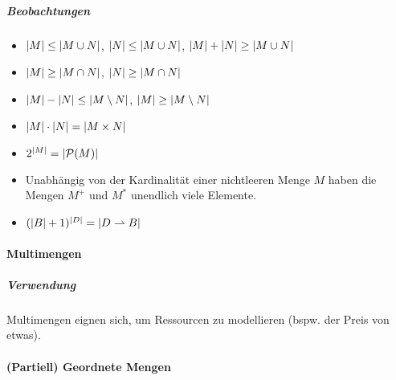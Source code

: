 	\subparagraph{Beobachtungen}
		\begin{itemize}
			\item $ \abs{M} \leq \abs{M \cup N} $, $ \abs{N} \leq \abs{M \cup N} $, $ \abs{M} + \abs{N} \geq \abs{M \cup N} $
			\item $ \abs{M} \geq \abs{M \cap N} $, $ \abs{N} \geq \abs{M \cap N} $
			\item $ \abs{M} - \abs{N} \leq \abs{M \setminus N} $, $ \abs{M} \geq \abs{M \setminus N} $
			\item $ \abs{M} \cdot \abs{N} = \abs{M \times N} $
			\item $ 2 ^ { \abs{M} } = \abs{\mathcal{P}(M)} $
			\item Unabhängig von der Kardinalität einer nichtleeren Menge $ M $ haben die Mengen $ M ^ + $ und $ M ^ * $ unendlich viele Elemente.
			\item $ (\abs{B} + 1) ^ \abs{D} = \abs{D \rightharpoonup B} $
		\end{itemize}

	\paragraph{Multimengen}

		\subparagraph{Verwendung}
			Multimengen eignen sich, um Ressourcen zu modellieren (bspw. der Preis von etwas).

		\paragraph{(Partiell) Geordnete Mengen}


